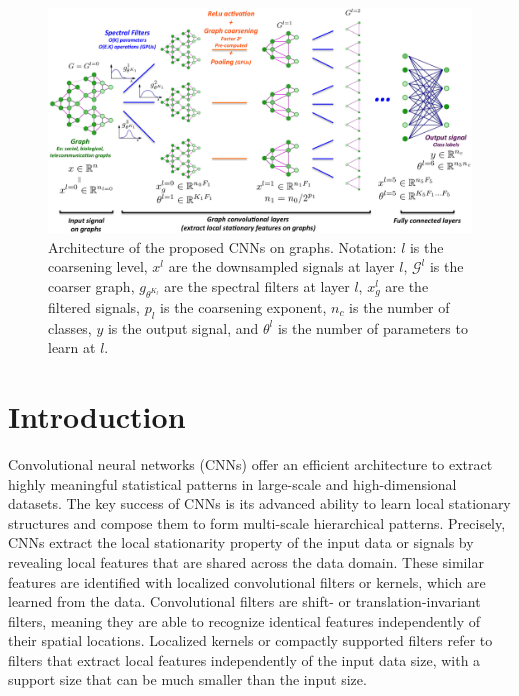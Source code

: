 \documentclass{article}
\newcommand{\G}{\mathcal{G}}
\begin{document}
\begin{figure}[h!]
\centering
\includegraphics[width=\textwidth]{images/illustrationCNNgraphs.eps}
\caption{Architecture of the proposed CNNs on graphs. Notation: $l$ is the
coarsening level, $x^l$ are the downsampled signals at layer $l$, $\G^l$ is the coarser graph, $g_{\theta^{K_l}}$ are the spectral filters at layer $l$, $x_g^l$ are the filtered signals, $p_l$ is the coarsening exponent, $n_c$ is the number of classes, $y$ is the output signal, and $\theta^l$ is the number of parameters to learn at $l$.}
\label{fig:}
\end{figure}

\section{Introduction}

Convolutional neural networks (CNNs) \cite{pro:LeCunBottouBengioHaffner98MNIST}
offer an efficient architecture to extract highly meaningful statistical
patterns in large-scale and high-dimensional datasets. The key success of CNNs
is its advanced ability to learn local stationary structures and compose them to
form multi-scale hierarchical patterns. Precisely, CNNs extract the local
stationarity property of the input data or signals by revealing local features
that are shared across the data domain. These similar features are identified
with localized convolutional filters or kernels, which are learned from the
data. Convolutional filters are shift- or translation-invariant filters, meaning
they are able to recognize identical features independently of their spatial
locations. Localized kernels or compactly supported filters refer to filters
that extract local features independently of the input data size, with a support
size that can be much smaller than the input size.
\end{document}
